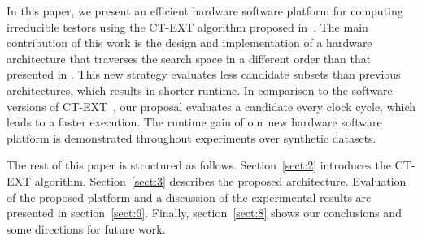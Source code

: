 \documentclass[authoryear,preprint,review,12pt]{elsarticle}
\begin{document}
In this paper, we present an efficient hardware software platform for computing irreducible
testors using the CT-EXT algorithm proposed in~\citep{R22}. The main contribution of this
work is the design and implementation of a hardware architecture that traverses the search space in a 
different order than that presented in \citep{R11, R21,Rod14}. This new strategy evaluates less candidate
subsets than previous architectures, which results in shorter runtime. In comparison to the 
software versions of CT-EXT~\citep{R22, R23}, our proposal evaluates a candidate every clock cycle, which
leads to a faster execution. The runtime gain of our new hardware software platform is demonstrated throughout
experiments over synthetic datasets. 


The rest of this paper is structured as follows. Section~\ref{sect:2} introduces the CT-EXT algorithm. 
Section~\ref{sect:3} describes the proposed architecture.  
Evaluation of the proposed platform and a discussion of the experimental results are 
presented in section~\ref{sect:6}. Finally, section~\ref{sect:8} shows our conclusions and some directions 
for future work.
\end{document}
